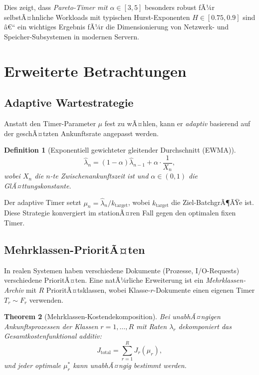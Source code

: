 ﻿\documentclass[12pt, a4paper]{article}
\newtheorem{theorem}{Theorem}[section]
\newtheorem{definition}[theorem]{Definition}
\begin{document}
Dies zeigt, dass \emph{Pareto-Timer mit $\alpha \in [3, 5]$} besonders robust fÃ¼r
selbstÃ¤hnliche Workloads mit typischen Hurst-Exponenten $H \in [0.75, 0.9]$ sind â€“
ein wichtiges Ergebnis fÃ¼r die Dimensionierung von Netzwerk- und
Speicher-Subsystemen in modernen Servern.

\section{Erweiterte Betrachtungen}\label{sec:extensions}

\subsection{Adaptive Wartestrategie}

Anstatt den Timer-Parameter $\mu$ fest zu wÃ¤hlen, kann er \emph{adaptiv}
basierend auf der geschÃ¤tzten Ankunftsrate angepasst werden.

\begin{definition}[Exponentiell gewichteter gleitender Durchschnitt (EWMA)]
\[
  \hat\lambda_n = (1-\alpha)\hat\lambda_{n-1} + \alpha \cdot \frac{1}{X_n},
\]
wobei $X_n$ die $n$-te Zwischenankunftszeit ist und $\alpha \in (0,1)$ die
GlÃ¤ttungskonstante.
\end{definition}

Der adaptive Timer setzt $\mu_n = \hat\lambda_n / k_{\mathrm{target}}$, wobei
$k_{\mathrm{target}}$ die Ziel-BatchgrÃ¶ÃŸe ist. Diese Strategie konvergiert
im stationÃ¤ren Fall gegen den optimalen fixen Timer.

\subsection{Mehrklassen-PrioritÃ¤ten}

In realen Systemen haben verschiedene Dokumente (Prozesse, I/O-Requests)
verschiedene PrioritÃ¤ten. Eine natÃ¼rliche Erweiterung ist ein
\emph{Mehrklassen-Archiv} mit $R$ PrioritÃ¤tsklassen, wobei Klasse-$r$-Dokumente
einen eigenen Timer $T_r \sim F_r$ verwenden.

\begin{theorem}[Mehrklassen-Kostendekomposition]
Bei unabhÃ¤ngigen Ankunftsprozessen der Klassen $r = 1,\ldots,R$ mit Raten
$\lambda_r$ dekomponiert das Gesamtkostenfunktional additiv:
\[
  J_{\mathrm{total}} = \sum_{r=1}^R J_r(\mu_r),
\]
und jeder optimale $\mu_r^*$ kann unabhÃ¤ngig bestimmt werden.
\end{theorem}
\end{document}
